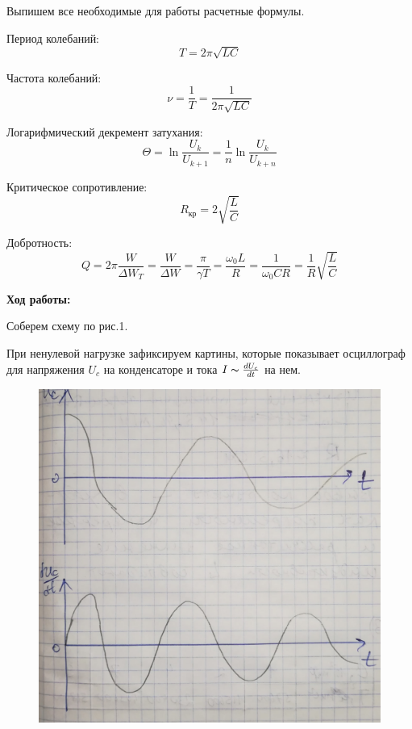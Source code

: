 \documentclass[a4paper,12pt]{article} %
\begin{document}
Выпишем все необходимые для работы расчетные формулы.

Период колебаний:
\begin{equation}
	T = 2\pi\sqrt{LC}
\end{equation}

Частота колебаний:
\begin{equation}
	\nu = \frac{1}{T} = \frac{1}{2\pi\sqrt{LC}}
\end{equation}

Логарифмический декремент затухания:
\begin{equation}
	\Theta = \ln{\frac{U_{k}}{U_{k+1}}} = \frac{1}{n}\ln{\frac{U_{k}}{U_{k+n}}}
\end{equation}

Критическое сопротивление:
\begin{equation}
	R_{\text{кр}} = 2\sqrt{\frac{L}{C}}
\end{equation}

Добротность:
\begin{equation}
	Q = 2\pi\frac{W}{\Delta W_{T}} = \frac{W}{\Delta W} = \frac{\pi}{\gamma T} = \frac{\omega_{0}L}{R} = \frac{1}{\omega_{0}CR} = \frac{1}{R}\sqrt{\frac{L}{C}}
\end{equation}


\newpage

\textbf{Ход работы:}

Соберем схему по рис.1.

При ненулевой нагрузке зафиксируем картины, которые показывает осциллограф для напряжения $U_c$ на конденсаторе и тока $I \thicksim \frac{dU_c}{dt}$ на нем.

\begin{figure}[h!]
	\centering
	\includegraphics[scale=0.287]{Pictures/Конд.jpg}
\end{figure}
\end{document}
